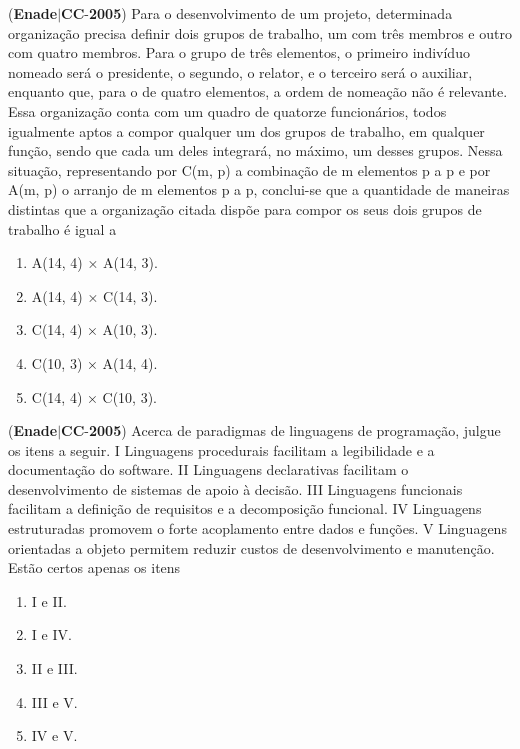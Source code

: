 \documentclass{exam}
\begin{document}
\begin{questions}
\begin{enumerate}[label=\alph*)]
	\end{enumerate}

\question (\textbf{Enade}$|$\textbf{CC}-\textbf{2005}) Para o desenvolvimento de um projeto,
determinada organização precisa definir dois grupos de
trabalho, um com três membros e outro com quatro
membros. Para o grupo de três elementos, o primeiro
indivíduo nomeado será o presidente, o segundo, o
relator, e o terceiro será o auxiliar, enquanto que, para
o de quatro elementos, a ordem de nomeação não é
relevante. Essa organização conta com um quadro de
quatorze funcionários, todos igualmente aptos a compor
qualquer um dos grupos de trabalho, em qualquer
função, sendo que cada um deles integrará, no máximo,
um desses grupos.
Nessa situação, representando por C(m, p) a combinação de
m elementos p a p e por A(m, p) o arranjo de m elementos
p a p, conclui-se que a quantidade de maneiras distintas que a
organização citada dispõe para compor os seus dois grupos de
trabalho é igual a
	\begin{enumerate}[label=\alph*)]
		\item  A(14, 4) × A(14, 3).
		\item  A(14, 4) × C(14, 3).
		\item  C(14, 4) × A(10, 3).
		\item  C(10, 3) × A(14, 4).
		\item  C(14, 4) × C(10, 3).

	\end{enumerate}

\question (\textbf{Enade}$|$\textbf{CC}-\textbf{2005}) Acerca de paradigmas de linguagens de programação, julgue
os itens a seguir.
I Linguagens procedurais facilitam a legibilidade e a
documentação do software.
II Linguagens declarativas facilitam o desenvolvimento de
sistemas de apoio à decisão.
III Linguagens funcionais facilitam a definição de requisitos
e a decomposição funcional.
IV Linguagens estruturadas promovem o forte acoplamento
entre dados e funções.
V Linguagens orientadas a objeto permitem reduzir custos de
desenvolvimento e manutenção.
Estão certos apenas os itens
	\begin{enumerate}[label=\alph*)]
		\item  I e II. 
		\item  I e IV. 
		\item  II e III.
		\item  III e V.
		\item  IV e V.

	\end{enumerate}


\end{questions}
\end{document}
